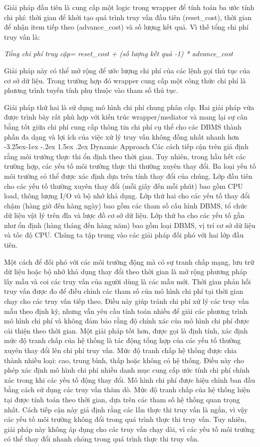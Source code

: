 \documentclass[a4paper]{article}
\makeatletter
\newcounter {subsubsubsection}[subsubsection]
\newcommand\subsubsubsection{\@startsection{subsubsubsection}{4}{\z@}%
                                     {-3.25ex\@plus -1ex \@minus -.2ex}%
                                     {1.5ex \@plus .2ex}%
                                     {\normalfont\normalsize\bfseries}}
\makeatother
\begin{document}
Giải pháp đầu tiên là cung cấp một logic trong wrapper để tính toán ba ước tính chi phí: thời gian để khởi tạo quá trình truy vấn đầu tiên (reset\_cost), thời gian để nhận item tiếp theo (advance\_cost) và số lượng kết quả. Vì thế tổng chi phí truy vấn là:

\textit{Tổng chi phí truy cập= reset\_cost + (số lượng kết quả -1) * advance\_cost}

Giải pháp này có thể mở rộng để ước lượng chi phí của các lệnh gọi thủ tục của cơ sở dữ liệu. Trong trường hợp đó wrapper cung cấp một công thức chi phí là phương trình tuyến tính phụ thuộc vào tham số thủ tục.

Giải pháp thứ hai là sử dụng mô hình chi phí chung phân cấp. Hai giải pháp vừa được trình bày rất phù hợp với kiến trúc wrapper/mediator và mang lại sự cân bằng tốt giữa chi phí cung cấp thông tin chi phí cụ thể cho các DBMS thành phần đa dạng và lợi ích của việc xử lý truy vấn không đồng nhất nhanh hơn
\subsubsubsection{Dynamic Approach}
Các cách tiếp cận trên giả định rằng môi trường thực thi ổn định theo thời gian. Tuy nhiên, trong hầu hết các trường hợp, các yếu tố môi trường thực thi thường xuyên thay đổi. Ba loại yếu tố môi trường có thể được xác định dựa trên tính thay đổi của chúng. Lớp đầu tiên cho các yếu tố thường xuyên thay đổi (mỗi giây đến mỗi phút) bao gồm CPU load, thông lượng I/O và bộ nhớ khả dụng. Lớp thứ hai cho các yếu tố thay đổi chậm (hàng giờ đến hàng ngày) bao gồm các tham số cấu hình DBMS, tổ chức dữ liệu vật lý trên đĩa và lược đồ cơ sở dữ liệu.
Lớp thứ ba cho các yếu tố gần như ổn định (hàng tháng đến hàng năm) bao gồm loại DBMS, vị trí cơ sở dữ liệu và tốc độ CPU. Chúng ta tập trung vào các giải pháp đối phó với hai lớp đầu tiên.


Một cách để đối phó với các môi trường động mà có sự tranh chấp mạng, lưu trữ dữ liệu hoặc bộ nhớ khả dụng thay đổi theo thời gian là mở rộng phương pháp lấy mẫu và coi các truy vấn của người dùng là các mẫu mới. Thời gian phản hồi truy vấn được đo để điều chỉnh các tham số của mô hình chi phí tại thời gian chạy cho các truy vấn tiếp theo. Điều này giúp tránh chi phí xử lý các truy vấn mẫu theo định kỳ, nhưng vẫn yêu cầu tính toán nhiều để giải các phương trình mô hình chi phí và không đảm bảo rằng độ chính xác của mô hình chi phí được cải thiện theo thời gian. Một giải pháp tốt hơn, được gọi là định tính, xác định mức độ tranh chấp của hệ thống là tác động tổng hợp của các yếu tố thường xuyên thay đổi lên chi phí truy vấn. Mức độ tranh chấp hệ thống được chia thành nhiều loại: cao, trung bình, thấp hoặc không có hệ thống. Điều này cho phép xác định mô hình chi phí nhiều danh mục cung cấp ước tính chi phí chính xác trong khi các yếu tố động thay đổi. Mô hình chi phí được hiệu chỉnh ban đầu bằng cách sử dụng các truy vấn thăm dò. Mức độ tranh chấp của hệ thống hiện tại được tính toán theo thời gian, dựa trên các tham số hệ thống quan trọng nhất. Cách tiếp cận này giả định rằng các lần thực thi truy vấn là ngắn, vì vậy các yếu tố môi trường không đổi trong quá trình thực thi truy vấn. Tuy nhiên, giải pháp này không áp dụng cho các truy vấn chạy dài, vì các yếu tố môi trường có thể thay đổi nhanh chóng trong quá trình thực thi truy vấn.
\end{document}

